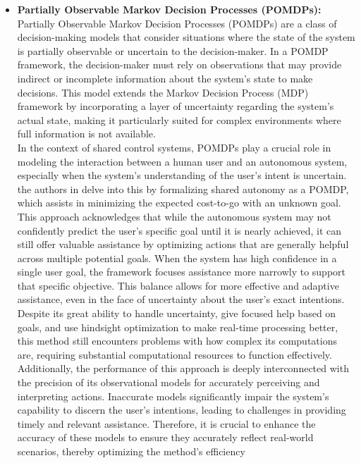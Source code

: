 \begin{itemize}
    \item\textbf{Partially Observable Markov Decision Processes (POMDPs):} Partially Observable Markov Decision Processes (POMDPs) are a class of decision-making models that consider situations where the state of the system is partially observable or uncertain to the decision-maker. 
    In a POMDP framework, the decision-maker must rely on observations that may provide indirect or incomplete information about the system's state to make decisions. 
    This model extends the Markov Decision Process (MDP) framework by incorporating a layer of uncertainty regarding the system's actual state, making it particularly suited for complex environments where full information is not available.\\
    In the context of shared control systems, POMDPs play a crucial role in modeling the interaction between a human user and an autonomous system, especially when the system's understanding of the user's intent is uncertain.
    the authors in \cite{doi:10.1177/0278364918776060} delve into this by formalizing shared autonomy as a POMDP, which assists in minimizing the expected cost-to-go with an unknown goal.
    This approach acknowledges that while the autonomous system may not confidently predict the user's specific goal until it is nearly achieved, it can still offer valuable assistance by optimizing actions that are generally helpful across multiple potential goals.
    When the system has high confidence in a single user goal, the framework focuses assistance more narrowly to support that specific objective. This balance allows for more effective and adaptive assistance, even in the face of uncertainty about the user's exact intentions.\\
    Despite its great ability to handle uncertainty, give focused help based on goals, and use hindsight optimization to make real-time processing better, this method still encounters problems with how complex its computations are, requiring substantial computational resources to function effectively.
    Additionally, the performance of this approach is deeply interconnected with the precision of its observational models for accurately perceiving and interpreting actions. 
    Inaccurate models significantly impair the system's capability to discern the user's intentions, leading to challenges in providing timely and relevant assistance. 
    Therefore, it is crucial to enhance the accuracy of these models to ensure they accurately reflect real-world scenarios, thereby optimizing the method's efficiency


\end{itemize}
